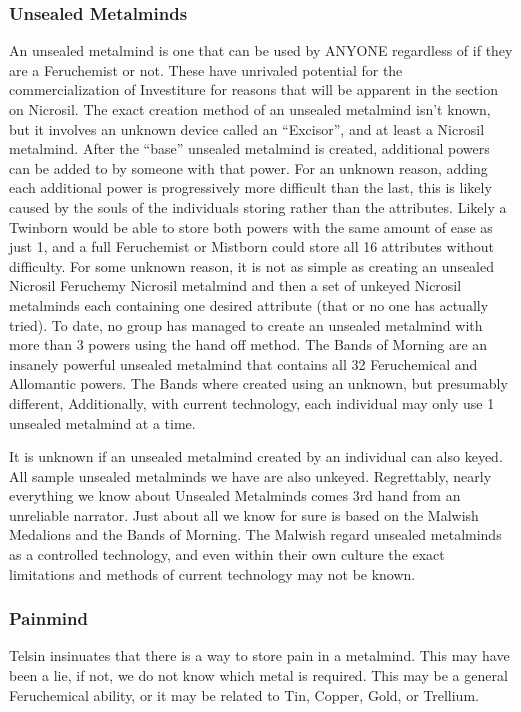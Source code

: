 \documentclass[conference]{IEEEtran}
\newcommand{\n}{\hfill\break}
\begin{document}
\subsubsection*{\textbf{Unsealed Metalminds}}\hfill\break\indent
An unsealed metalmind is one that can be used by ANYONE regardless of if they are a Feruchemist or not.\cite{unsealed}  These have unrivaled potential for the commercialization of Investiture for reasons that will be apparent in the section on Nicrosil.  The exact creation method of an unsealed metalmind isn't known, but it involves an unknown device called an ``Excisor'', and at least a Nicrosil metalmind.\cite{BoM-CH21}  After the ``base'' unsealed metalmind is created, additional powers can be added to by someone with that power.  For an unknown reason, adding each additional power is progressively more difficult than the last, this is likely caused by the souls of the individuals storing rather than the attributes.  Likely a Twinborn would be able to store both powers with the same amount of ease as just 1,\cite{BoM-CH21} and a full Feruchemist or Mistborn could store all 16 attributes without difficulty.\cite{BoM-CH28}  For some unknown reason, it is not as simple as creating an unsealed Nicrosil Feruchemy Nicrosil metalmind and then a set of unkeyed Nicrosil metalminds each containing one desired attribute (that or no one has actually tried).  To date, no group has managed to create an unsealed metalmind with more than 3 powers using the hand off method.  The Bands of Morning are an insanely powerful unsealed metalmind that contains all 32 Feruchemical and Allomantic powers.\cite{BoM-CH28}  The Bands where created using an unknown, but presumably different, Additionally, with current technology, each individual may only use 1 unsealed metalmind at a time.\cite{BoM-CH21}

It is unknown if an unsealed metalmind created by an individual can also keyed.  All sample unsealed metalminds we have are also unkeyed.
\newpage
Regrettably, nearly everything we know about Unsealed Metalminds comes 3rd hand from an unreliable narrator.\cite{TLM-CH9}  Just about all we know for sure is based on the Malwish Medalions and the Bands of Morning.  The Malwish regard unsealed metalminds as a controlled technology, and even within their own culture the exact limitations and methods of current technology may not be known.\n
\subsubsection*{\textbf{Painmind}}\hfill\break\indent
Telsin insinuates that there is a way to store pain in a metalmind.\cite{TLM-CH34}  This may have been a lie, if not, we do not know which metal is required.  This may be a general Feruchemical ability, or it may be related to Tin, Copper, Gold, or Trellium.
\hfill
\n
\end{document}
